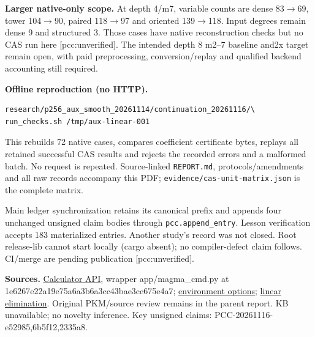 \documentclass[10pt,a4paper]{article}
\begin{document}
\textbf{Larger native-only scope.} At depth 4/m7, variable counts are
dense 83$\to$69, tower 104$\to$90, paired 118$\to$97 and oriented 139$\to$118.
Input degrees remain dense 9 and structured 3. Those cases have native
reconstruction checks but no CAS run here [pcc:unverified]. The intended
depth 8 m2--7 baseline and2x target remain open, with paid preprocessing,
conversion/replay and qualified backend accounting still required.

\textbf{Offline reproduction (no HTTP).}
\begin{verbatim}
research/p256_aux_smooth_20261114/continuation_20261116/\
run_checks.sh /tmp/aux-linear-001
\end{verbatim}
This rebuilds 72 native cases, compares coefficient certificate bytes,
replays all retained successful CAS results and rejects the recorded
errors and a malformed batch. No request is repeated. Source-linked
\texttt{REPORT.md}, protocols/amendments and all raw records accompany
this PDF; \texttt{evidence/cas-unit-matrix.json} is the complete matrix.

Main ledger synchronization retains its canonical prefix and appends
four unchanged unsigned claim bodies through \texttt{pcc.append\_entry}.
Lesson verification accepts 183 materialized entries. Another study's
record was not closed. Root release-lib cannot start locally (cargo
absent); no compiler-defect claim follows. CI/merge are pending publication
[pcc:unverified].

\textbf{Sources.}
\href{https://github.com/Magma-Maths/calculator/blob/main/README.md}{Calculator API},
wrapper app/magma\_cmd.py at 1e6267e22a19e75a6a3b6a3cc43bae3ce675e4a7;
\href{https://magma.maths.usyd.edu.au/magma/handbook/text/49}{environment options};
\href{https://magma.maths.usyd.edu.au/magma/handbook/text/1447}{linear elimination}.
Original PKM/source review remains in the parent report. KB unavailable;
no novelty inference. Key unsigned claims: PCC-20261116-e52985,6b5f12,2335a8.
\end{document}
